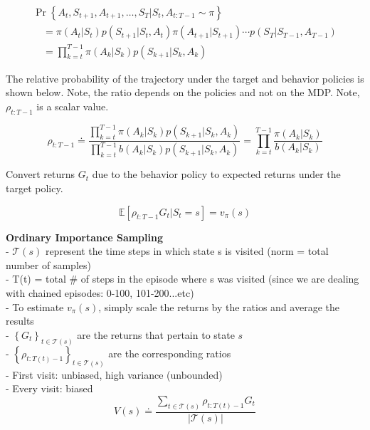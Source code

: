 \documentclass{article}
\begin{document}
\begin{equation}
\begin{array}{l}
\operatorname{Pr}\left\{A_{t}, S_{t+1}, A_{t+1}, \ldots, S_{T} | S_{t}, A_{t: T-1} \sim \pi\right\} \\
\quad=\pi\left(A_{t} | S_{t}\right) p\left(S_{t+1} | S_{t}, A_{t}\right) \pi\left(A_{t+1} | S_{t+1}\right) \cdots p\left(S_{T} | S_{T-1}, A_{T-1}\right) \\
\quad=\prod_{k=t}^{T-1} \pi\left(A_{k} | S_{k}\right) p\left(S_{k+1} | S_{k}, A_{k}\right)
\end{array}
\end{equation}

\newpage
\noindent
The relative probability of the trajectory under the target and behavior
policies is shown below. Note, the ratio depends on the policies and not on the
MDP. Note, $\rho_{t: T-1}$ is a scalar value.

\begin{equation}
\rho_{t: T-1} \doteq \frac{\prod_{k=t}^{T-1} \pi\left(A_{k} | S_{k}\right) p\left(S_{k+1} | S_{k}, A_{k}\right)}{\prod_{k=t}^{T-1} b\left(A_{k} | S_{k}\right) p\left(S_{k+1} | S_{k}, A_{k}\right)}=\prod_{k=t}^{T-1} \frac{\pi\left(A_{k} | S_{k}\right)}{b\left(A_{k} | S_{k}\right)}
\end{equation}

\noindent
Convert returns $G_{t}$ due to the behavior policy to expected returns under the
target policy.

\begin{equation}
\mathbb{E}\left[\rho_{t: T-1} G_{t} | S_{t}=s\right]=v_{\pi}(s)
\end{equation}

\noindent
\textbf{Ordinary Importance Sampling}\\
- $\mathcal{T}(s)$ represent the time steps in which state s is visited (norm =
total number of samples)\\
- T(t) = total \# of steps in the episode where s was visited (since we are dealing
with chained episodes: 0-100, 101-200...etc) \\
- To estimate $v_{\pi}(s)$, simply scale the returns by the ratios and average
the results\\
- $\left\{G_{t}\right\}_{t \in \mathcal{T}(s)}$ are the returns that pertain to
state $s$ \\
- $\left\{\rho_{t: T(t)-1}\right\}_{t \in \mathcal{T}(s)}$ are the corresponding
ratios\\
- First visit: unbiased, high variance (unbounded)\\
- Every visit: biased
\begin{equation}
V(s) \doteq \frac{\sum_{t \in \mathcal{T}(s)} \rho_{t: T(t)-1} G_{t}}{|\mathcal{T}(s)|}
\end{equation}
\end{document}
